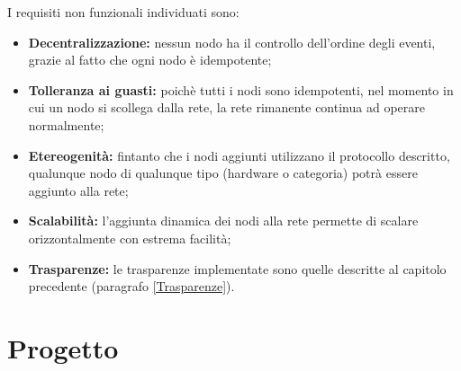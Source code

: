 \documentclass{memoir}
\begin{document}
I requisiti non funzionali individuati sono:
\begin{itemize}
\item \textbf{Decentralizzazione:} nessun nodo ha il controllo dell'ordine degli
	   eventi, grazie al fatto che ogni nodo è idempotente;
\item \textbf{Tolleranza ai guasti:} poichè tutti i nodi sono idempotenti, nel momento
	   in cui un nodo si scollega dalla rete, la rete rimanente continua ad operare
	   normalmente;
\item \textbf{Etereogenità:} fintanto che i nodi aggiunti utilizzano il protocollo
	   descritto, qualunque nodo di qualunque tipo (hardware o categoria) potrà essere
	   aggiunto alla rete;
\item \textbf{Scalabilità:} l'aggiunta dinamica dei nodi alla rete permette di scalare
	   orizzontalmente con estrema facilità;
\item \textbf{Trasparenze:} le trasparenze implementate sono quelle descritte al
	   capitolo precedente (paragrafo \ref{Trasparenze}).
\end{itemize}

%
%
%
%
%



\chapter{Progetto}\label{ch:progetto}
\end{document}
